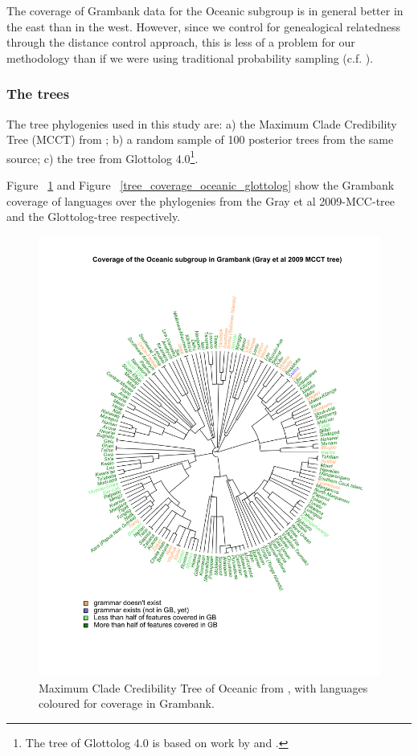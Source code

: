 \documentclass[a4paper,10pt]{article} %
\begin{document}
The coverage of Grambank data for the Oceanic subgroup is in general better in the east than in the west. However, since we control for genealogical relatedness through the distance control approach, this is less of a problem for our methodology than if we were using traditional probability sampling (c.f. \citet{ross2004morphosyntactic}).

\subsubsection{The trees}
The tree phylogenies used in this study are: a) the Maximum Clade Credibility Tree (MCCT) from \citet{grayetal_2009}; b) a random sample of 100 posterior trees from the same source; c) the tree from Glottolog 4.0\footnote{The tree of Glottolog 4.0 \citep{glottolog40} is based on work by \citet{blust_2009, blust_2014} and \citet{blust_chen_2017}.}. 

Figure ~\ref{tree_coverage_oceanic_gray} and Figure ~\ref{tree_coverage_oceanic_glottolog} show the Grambank coverage of languages over the phylogenies from the Gray et al 2009-MCC-tree and the Glottolog-tree respectively. 

\begin{figure}[H]
\centering
\includegraphics[width=\textwidth]{illustrations/plots_from_R/coverage_plots/tree/Oceanic_tree_desc_status_gray_et_al_tree_mcct.png}
\caption{{Maximum Clade Credibility Tree of Oceanic from \citet{grayetal_2009}, with languages coloured for coverage in Grambank.}}
\label{tree_coverage_oceanic_gray}
\end{figure}
\end{document}

